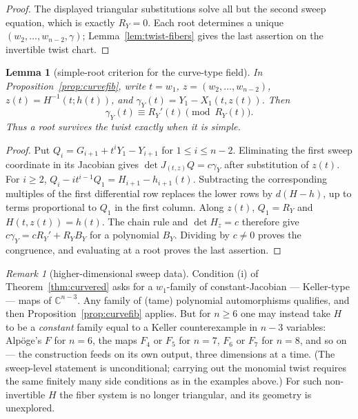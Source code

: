 \documentclass[11pt]{article}
\numberwithin{equation}{section}
\theoremstyle{plain}
\newtheorem{lemma}[theorem]{Lemma}
\theoremstyle{definition}
\theoremstyle{remark}
\newtheorem{remark}[theorem]{Remark}
\newcommand{\C}{\mathbb{C}}
\begin{document}
\begin{proof}
The displayed triangular substitutions solve all but the second sweep
equation, which is exactly $R_Y=0$. Each root determines a unique
$(w_2,\ldots,w_{n-2},\gamma)$; Lemma~\ref{lem:twist-fibers} gives the
last assertion on the invertible twist chart.
\end{proof}

\begin{lemma}[simple-root criterion for the curve-type field]\label{lem:curve-derivative}
In Proposition~\ref{prop:curvefib}, write $t=w_1$,
$z=(w_2,\ldots,w_{n-2})$, $z(t)=H^{-1}(t;h(t))$, and
$\gamma_Y(t)=Y_1-X_1(t,z(t))$. Then
\[
 \gamma_Y(t)\equiv R_Y'(t)\pmod{R_Y(t)}.
\]
Thus a root survives the twist exactly when it is simple.
\end{lemma}
\begin{proof}
Put $Q_i=G_{i+1}+t^iY_1-Y_{i+1}$ for $1\le i\le n-2$.
Eliminating the first sweep coordinate in its Jacobian gives
$\det J_{(t,z)}Q=c\gamma_Y$ after substitution of $z(t)$.
For $i\ge2$,
$Q_i-i t^{i-1}Q_1=H_{i+1}-h_{i+1}(t)$.
Subtracting the corresponding multiples of the first differential row
replaces the lower rows by $d(H-h)$, up to terms proportional to $Q_1$
in the first column. Along $z(t)$, $Q_1=R_Y$ and $H(t,z(t))=h(t)$.
The chain rule and $\det H_z=c$ therefore give
$c\gamma_Y=cR_Y'+R_Y B_Y$ for a polynomial $B_Y$.
Dividing by $c\ne0$ proves the congruence, and evaluating at a root
proves the last assertion.
\end{proof}

\begin{remark}[higher-dimensional sweep data]
Condition (i) of Theorem~\ref{thm:curvered} asks for a $w_1$-family of
constant-Jacobian --- Keller-type --- maps of $\C^{n-3}$. Any family of
(tame) polynomial automorphisms qualifies, and then
Proposition~\ref{prop:curvefib} applies. But for $n\ge6$ one may instead take
$H$ to be a \emph{constant} family equal to a Keller counterexample in $n-3$
variables: Alp\"oge's $F$ for $n=6$, the maps $F_4$ or $F_5$ for $n=7$, $F_6$
or $F_7$ for $n=8$, and so on --- the construction feeds on its own output,
three dimensions at a time. (The sweep-level statement is unconditional;
carrying out the monomial twist requires the same finitely many side
conditions as in the examples above.) For such non-invertible $H$ the fiber
system is no longer triangular, and its geometry is unexplored.
\end{remark}
\end{document}
